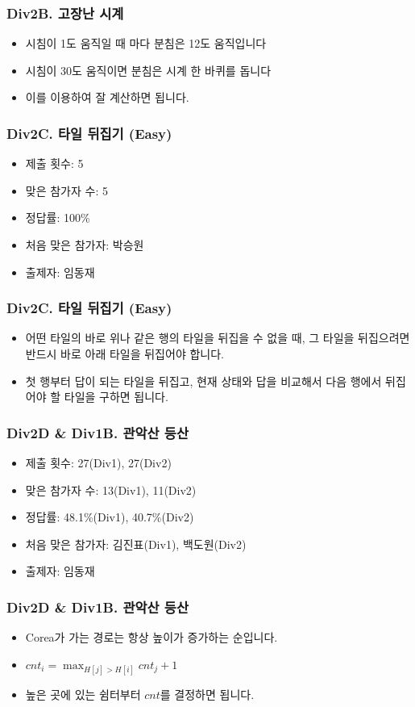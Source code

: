 \documentclass[xetex]{beamer}
\begin{document}
\begin{frame}
  \frametitle{Div2B. 고장난 시계}
  \begin{itemize}
    \item 시침이 1도 움직일 때 마다 분침은 12도 움직입니다
    \item 시침이 30도 움직이면 분침은 시계 한 바퀴를 돕니다
    \item 이를 이용하여 잘 계산하면 됩니다.
  \end{itemize}
\end{frame}

\begin{frame}
  \frametitle{Div2C. 타일 뒤집기 (Easy)}
  \begin{itemize}
    \item 제출 횟수: 5
    \item 맞은 참가자 수: 5
    \item 정답률: 100\%
    \item 처음 맞은 참가자: 박승원
    \item 출제자: 임동재
  \end{itemize}
\end{frame}

\begin{frame}
  \frametitle{Div2C. 타일 뒤집기 (Easy)}
  \begin{itemize}
    \item 어떤 타일의 바로 위나 같은 행의 타일을 뒤집을 수 없을 때, 그 타일을 뒤집으려면 반드시 바로 아래 타일을 뒤집어야 합니다.
    \item 첫 행부터 답이 되는 타일을 뒤집고, 현재 상태와 답을 비교해서 다음 행에서 뒤집어야 할 타일을 구하면 됩니다.
  \end{itemize}
\end{frame}

\begin{frame}
  \frametitle{Div2D \& Div1B. 관악산 등산}
  \begin{itemize}
    \item 제출 횟수: 27(Div1), 27(Div2)
    \item 맞은 참가자 수: 13(Div1), 11(Div2)
    \item 정답률: 48.1\%(Div1), 40.7\%(Div2)
    \item 처음 맞은 참가자: 김진표(Div1), 백도원(Div2)
    \item 출제자: 임동재
  \end{itemize}
\end{frame}

\begin{frame}
  \frametitle{Div2D \& Div1B. 관악산 등산}
  \begin{itemize}
    \item Corea가 가는 경로는 항상 높이가 증가하는 순입니다.
    \item $cnt_{i} = \max_{H[j] > H[i]} cnt_{j} + 1$
    \item 높은 곳에 있는 쉼터부터 $cnt$를 결정하면 됩니다.
  \end{itemize}
\end{frame}
\end{document}
